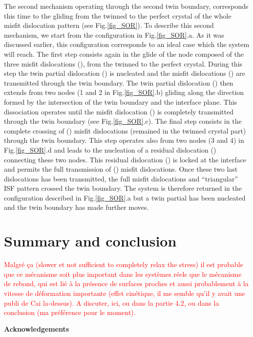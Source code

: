 \documentclass[final,3p,times,twocolumn]{elsarticle}
\begin{document}
The second mechanism operating through the second twin boundary, corresponds this time to the gliding from the twinned to the perfect crystal of the whole misfit dislocation pattern (see Fig.\ref{fig_SOR}). To describe this second mechanism, we start from the configuration in Fig.\ref{fig_SOR}.a. As it was discussed earlier, this configuration corresponds to an ideal case which the system will reach. The first step consists again in the glide of the node composed of the three misfit dislocations (), from the twinned to the perfect crystal. During this step the twin partial dislocation () is nucleated and the misfit dislocations () are transmitted through the twin boundary. The twin partial dislocation () then extends from two nodes (1 and 2 in Fig.\ref{fig_SOR}.b) gliding along the direction formed by the intersection of the twin boundary and the interface plane. This dissociation operates until the misfit dislocation () is completely transmitted through the twin boundary (see Fig.\ref{fig_SOR}.c). The final step consists in the complete crossing of () misfit dislocations (remained in the twinned crystal part) through the twin boundary. This step operates also from two nodes (3 and 4) in Fig.\ref{fig_SOR}.d and leads to the nucleation of a residual dislocation () connecting these two nodes. This residual dislocation () is locked at the interface and permits the full transmission of () misfit dislocations. Once these two last dislocations has been transmitted, the full misfit dislocations and ``triangular'' ISF pattern crossed the twin boundary. The system is therefore returned in the configuration described in Fig.\ref{fig_SOR}.a but a twin partial has been nucleated and the twin boundary has made further moves.

\section{Summary and conclusion}
\label{part_conclusion}

\textcolor{red}{Malgré ça (slower et not sufficient to completely relax the stress) il est probable que ce mécanisme soit plus important dans les systèmes réels que le mécanisme de rebond, qui est lié à la présence de surfaces proches et aussi probablement à la vitesse de déformation importante (effet cinétique, il me semble qu'il y avait une publi de Cai la-dessus). A discuter, ici, ou dans la partie 4.2, ou dans la conclusion (ma préférence pour le moment).}

\noindent\textbf{Acknowledgements}\newline
\label{part_acknowledgements}
\end{document}
